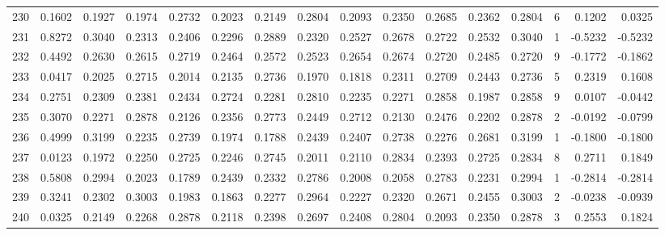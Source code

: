 \begin{tabular}{lrrrrrrrrrrrrrrr}
230 &      0.1602 &  0.1927 &  0.1974 &  0.2732 &  0.2023 &  0.2149 &  0.2804 &  0.2093 &  0.2350 &  0.2685 &   0.2362 &     0.2804 &      6 &                    0.1202 &                     0.0325 \\
231 &      0.8272 &  0.3040 &  0.2313 &  0.2406 &  0.2296 &  0.2889 &  0.2320 &  0.2527 &  0.2678 &  0.2722 &   0.2532 &     0.3040 &      1 &                   -0.5232 &                    -0.5232 \\
232 &      0.4492 &  0.2630 &  0.2615 &  0.2719 &  0.2464 &  0.2572 &  0.2523 &  0.2654 &  0.2674 &  0.2720 &   0.2485 &     0.2720 &      9 &                   -0.1772 &                    -0.1862 \\
233 &      0.0417 &  0.2025 &  0.2715 &  0.2014 &  0.2135 &  0.2736 &  0.1970 &  0.1818 &  0.2311 &  0.2709 &   0.2443 &     0.2736 &      5 &                    0.2319 &                     0.1608 \\
234 &      0.2751 &  0.2309 &  0.2381 &  0.2434 &  0.2724 &  0.2281 &  0.2810 &  0.2235 &  0.2271 &  0.2858 &   0.1987 &     0.2858 &      9 &                    0.0107 &                    -0.0442 \\
235 &      0.3070 &  0.2271 &  0.2878 &  0.2126 &  0.2356 &  0.2773 &  0.2449 &  0.2712 &  0.2130 &  0.2476 &   0.2202 &     0.2878 &      2 &                   -0.0192 &                    -0.0799 \\
236 &      0.4999 &  0.3199 &  0.2235 &  0.2739 &  0.1974 &  0.1788 &  0.2439 &  0.2407 &  0.2738 &  0.2276 &   0.2681 &     0.3199 &      1 &                   -0.1800 &                    -0.1800 \\
237 &      0.0123 &  0.1972 &  0.2250 &  0.2725 &  0.2246 &  0.2745 &  0.2011 &  0.2110 &  0.2834 &  0.2393 &   0.2725 &     0.2834 &      8 &                    0.2711 &                     0.1849 \\
238 &      0.5808 &  0.2994 &  0.2023 &  0.1789 &  0.2439 &  0.2332 &  0.2786 &  0.2008 &  0.2058 &  0.2783 &   0.2231 &     0.2994 &      1 &                   -0.2814 &                    -0.2814 \\
239 &      0.3241 &  0.2302 &  0.3003 &  0.1983 &  0.1863 &  0.2277 &  0.2964 &  0.2227 &  0.2320 &  0.2671 &   0.2455 &     0.3003 &      2 &                   -0.0238 &                    -0.0939 \\
240 &      0.0325 &  0.2149 &  0.2268 &  0.2878 &  0.2118 &  0.2398 &  0.2697 &  0.2408 &  0.2804 &  0.2093 &   0.2350 &     0.2878 &      3 &                    0.2553 &                     0.1824 \\

\end{tabular}
